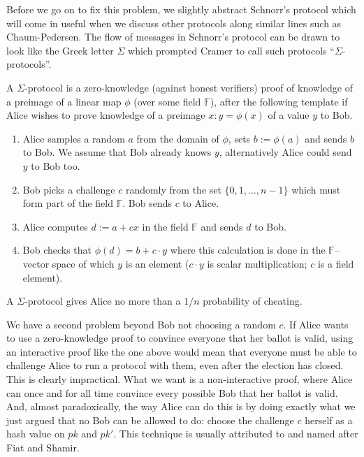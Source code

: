 \documentclass{llncs}
\begin{document}
Before we go on to fix this problem, we slightly abstract Schnorr's protocol
which will come in useful when we discuss other protocols along similar lines
such as Chaum-Pedersen. The flow of messages in Schnorr's protocol can be drawn
to look like the Greek letter $\Sigma$ which prompted Cramer to call such
protocols ``$\Sigma$-protocols''.

\begin{definition}
A $\Sigma$-protocol is a zero-knowledge (against honest verifiers) proof of
knowledge of a preimage of a linear map $\phi$ (over some field $\mathbb F$),
after the following template if Alice wishes to prove knowledge of a preimage
$x: y = \phi(x)$ of a value $y$ to Bob.
\begin{enumerate}
\item Alice samples a random $a$ from the domain of $\phi$, sets $b := \phi(a)$
and sends $b$ to Bob. We assume that Bob already knows $y$, alternatively Alice
could send $y$ to Bob too.
\item Bob picks a challenge $c$ randomly from the set $\{0, 1, \ldots, n-1\}$
which must form part of the field $\mathbb F$. Bob sends $c$ to Alice.
\item Alice computes $d := a + cx$ in the field $\mathbb F$ and sends $d$ to
Bob.
\item Bob checks that $\phi(d) = b + c \cdot y$ where this calculation is done
in the $\mathbb F$--vector space of which $y$ is an element ($c \cdot y$ is
scalar multiplication; $c$ is a field element).
\end{enumerate}
\end{definition}
A $\Sigma$-protocol gives Alice no more than a $1/n$ probability of cheating.

We have a second problem beyond Bob not choosing a random $c$. If Alice wants to
use a zero-knowledge proof to convince everyone that her ballot is valid, using
an interactive proof like the one above would mean that everyone must be able to
challenge Alice to run a protocol with them, even after the election has closed.
This is clearly impractical. What we want is a non-interactive proof, where
Alice can once and for all time convince every possible Bob that her ballot is
valid. And, almost paradoxically, the way Alice can do this is by doing exactly
what we just argued that no Bob can be allowed to do: choose the challenge $c$
herself as a hash value on $pk$ and $pk'$. This technique is usually attributed
to and named after Fiat and Shamir\footnotemark \cite{FS86}.
\end{document}
